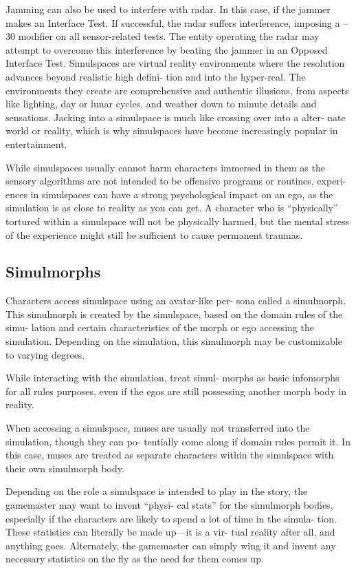 Jamming can also be used to interfere with radar. In 
this case, if the jammer makes an Interface Test. If 
successful, the radar suffers interference, imposing 
a –30 modifier on all sensor-related tests. The entity 
operating the radar may attempt to overcome this 
interference by beating the jammer in an Opposed 
Interface Test.
Simulspaces are virtual reality environments where 
the resolution advances beyond realistic high defini-
tion and into the hyper-real. The environments they 
create are comprehensive and authentic illusions, from 
aspects like lighting, day or lunar cycles, and weather 
down to minute details and sensations. Jacking into 
a simulspace is much like crossing over into a alter-
nate world or reality, which is why simulspaces have 
become increasingly popular in entertainment.

While simulspaces usually cannot harm characters 
immersed in them as the sensory algorithms are not 
intended to be offensive programs or routines, experi-
ences in simulspaces can have a strong psychological 
impact on an ego, as the simulation is as close to 
reality as you can get. A character who is ``physically'' 
tortured within a simulspace will not be physically 
harmed, but the mental stress of the experience might 
still be sufficient to cause permanent traumas.

\subsection{Simulmorphs}

Characters access simulspace using an avatar-like per-
sona called a simulmorph. This simulmorph is created by 
the simulspace, based on the domain rules of the simu-
lation and certain characteristics of the morph or ego 
accessing the simulation. Depending on the simulation, 
this simulmorph may be customizable to varying degrees.

While interacting with the simulation, treat simul-
morphs as basic infomorphs for all rules purposes, 
even if the egos are still possessing another morph 
body in reality.

When accessing a simulspace, muses are usually not 
transferred into the simulation, though they can po-
tentially come along if domain rules permit it. In this 
case, muses are treated as separate characters within 
the simulspace with their own simulmorph body.

Depending on the role a simulspace is intended to play 
in the story, the gamemaster may want to invent ``physi-
cal stats'' for the simulmorph bodies, especially if the 
characters are likely to spend a lot of time in the simula-
tion. These statistics can literally be made up—it is a vir-
tual reality after all, and anything goes. Alternately, the 
gamemaster can simply wing it and invent any necessary 
statistics on the fly as the need for them comes up.


